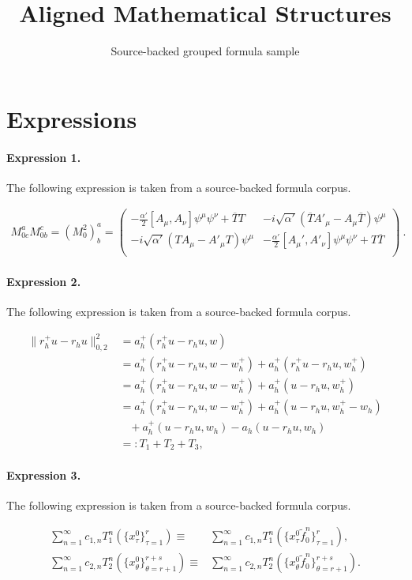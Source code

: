 \documentclass[11pt]{article}
\title{Aligned Mathematical Structures}
\author{Source-backed grouped formula sample}
\date{}
\begin{document}
\maketitle
\section{Expressions}
\paragraph{Expression 1.} The following expression is taken from a source-backed formula corpus.

\begin{align*}M^a_{0c}M^c_{0b}=(M_0^2)^a_b=\left(\begin{array}{cc}-\frac{\alpha'}{2}[A_{\mu},A_{\nu}]\psi^{\mu}\psi^{\nu} +\overline{T}T &-i\sqrt{\alpha'}(\overline{T}A'_{\mu}-A_{\mu}\overline{T})\psi^{\mu} \\-i\sqrt{\alpha'}(TA_{\mu}-A'_{\mu}T)\psi^{\mu} & -\frac{\alpha'}{2}[A_{\mu}',A'_{\nu}]\psi^{\mu}\psi^{\nu}+T\overline{T} \\\end{array}\right) \ .\end{align*}

\paragraph{Expression 2.} The following expression is taken from a source-backed formula corpus.

\begin{align*}\|r_h^+ u - r_h u\|_{0,2}^2 &= a_h^+(r_h^+ u - r_h u, w) \\&= a_h^+(r_h^+ u - r_h u, w - w_h^+) + a_h^+(r_h^+ u - r_h u, w_h^+) \\&= a_h^+(r_h^+ u - r_h u, w - w_h^+) + a_h^+(u - r_h u, w_h^+) \\&= a_h^+(r_h^+ u - r_h u, w - w_h^+) + a_h^+(u - r_h u, w_h^+ - w_h) \\&\;\;\; + a_h^+(u - r_h u, w_h) - a_h(u-r_h u, w_h) \\&=: T_1 + T_2 + T_3,\end{align*}

\paragraph{Expression 3.} The following expression is taken from a source-backed formula corpus.

\begin{align*}\sum_{n=1}^\infty c_{1,n}T_1^n\left(\{x_\tau^0\}_{\tau=1}^{r} \right)\equiv&\sum_{n=1}^\infty c_{1,n}T_1^n\left(\{x_\tau^0 \tilde{f}_0^n\}_{\tau=1}^{r} \right) , \\\sum_{n=1}^\infty c_{2,n}T_2^n\left(\{x_\theta^0\}_{\theta=r+1}^{r+s} \right) \equiv&\sum_{n=1}^\infty c_{2,n}T_2^n\left(\{x_\theta^0\tilde{f}_0^n\}_{\theta=r+1}^{r+s} \right).\end{align*}
\end{document}
